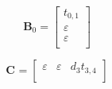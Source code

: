 \documentclass[11pt, a4paper, fleqn]{article}
\begin{document}
\begin{equation*}
\mathbf{B}_{0} = 
\left[\begin{array}{ c }
t_{0,1}\\
\varepsilon\\
\varepsilon\\
\end{array}\right]
\end{equation*}

\begin{equation*}
\mathbf{C}_{{}} = 
\left[\begin{array}{ ccc }
\varepsilon	&\varepsilon	&d_3t_{3,4}\\
\end{array}\right]
\end{equation*}
\end{document}
